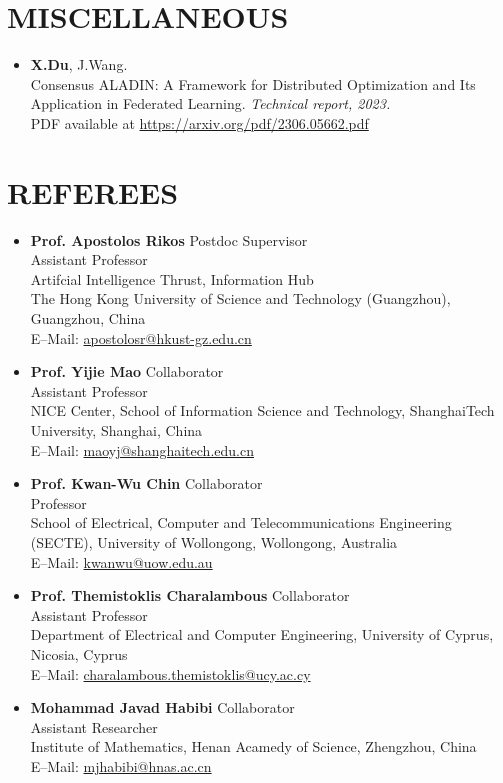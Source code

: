 \documentclass[paper=a4,fontsize=11pt]{scrartcl} %
\newcommand{\NewPart}[1]{\section*{\uppercase{#1}}}
\begin{document}
\NewPart{Miscellaneous}

\begin{itemize}
	\item {\textbf{X.Du}, J.Wang. \\
				{Consensus ALADIN: A Framework for Distributed Optimization and Its Application
						in Federated Learning.}
				\emph{Technical report, 2023.
				} \\
				PDF available at \url{https://arxiv.org/pdf/2306.05662.pdf}
			}
\end{itemize}
\NewPart{Referees}

\begin{itemize}
	\item \textbf{Prof. Apostolos Rikos} {\hfill Postdoc Supervisor}\\
Assistant Professor\\ Artifcial Intelligence Thrust, Information Hub\\
The Hong Kong University of Science and Technology (Guangzhou), Guangzhou, China\\
E--Mail: \url{apostolosr@hkust-gz.edu.cn}

	\item \textbf{Prof. Yijie Mao} {\hfill Collaborator}\\
Assistant Professor\\ NICE Center, School of Information Science and
Technology, ShanghaiTech University, Shanghai, China\\
E--Mail: \url{maoyj@shanghaitech.edu.cn}

	\item \textbf{Prof. Kwan-Wu Chin} {\hfill Collaborator}\\
Professor\\  School of Electrical, Computer and Telecommunications Engineering (SECTE), University of Wollongong, Wollongong, Australia \\
E--Mail: \url{kwanwu@uow.edu.au}

	\item \textbf{Prof. Themistoklis Charalambous} {\hfill Collaborator}\\
Assistant Professor\\ Department of Electrical and Computer Engineering, University of Cyprus, Nicosia, Cyprus \\
E--Mail: \url{charalambous.themistoklis@ucy.ac.cy}

	\item \textbf{Mohammad Javad Habibi} {\hfill Collaborator}\\
Assistant Researcher \\Institute of Mathematics, Henan Acamedy of Science, Zhengzhou, China \\
E--Mail: \url{mjhabibi@hnas.ac.cn}


\end{itemize}
\end{document}
